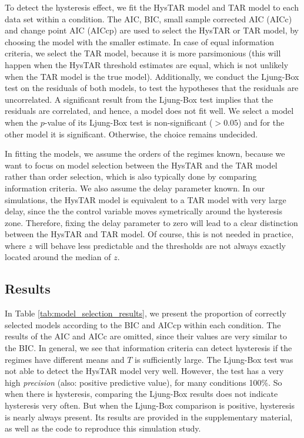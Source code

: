 \documentclass{article}
\begin{document}
To detect the hysteresis effect, we fit the HysTAR model and TAR model to each data set within a condition.
The AIC, BIC, small sample corrected AIC (AICc) and change point AIC (AICcp) are used to select the HysTAR or TAR model, by choosing the model with the smaller estimate.
In case of equal information criteria, we select the TAR model, because it is more parsimonious (this will happen when the HysTAR threshold estimates are equal, which is not unlikely when the TAR model is the true model). 
Additionally, we conduct the Ljung-Box test on the residuals of both models, to test the hypotheses that the residuals are uncorrelated.
A significant result from the Ljung-Box test implies that the residuals are correlated, and hence, a model does not fit well.
We select a model when the $p$-value of its Ljung-Box test is non-significant ($>0.05$) and for the other model it is significant. Otherwise, the choice remains undecided.

In fitting the models, we assume the orders of the regimes known, because we want to focus on model selection between the HysTAR and the TAR model rather than order selection, which is also typically done by comparing information criteria. 
We also assume the delay parameter known. 
In our simulations, the HysTAR model is equivalent to a TAR model with very large delay, since the the control variable moves symetrically around the hysteresis zone.
Therefore, fixing the delay parameter to zero will lead to a clear distinction between the HysTAR and TAR model.
Of course, this is not needed in practice, where $z$ will behave less predictable and the thresholds are not always exactly located around the median of $z$.

\subsection{Results}
\label{sec:model_selection_results}
In Table \ref{tab:model_selection_results}, we present the proportion of correctly selected models according to the BIC and AICcp within each condition. The results of the AIC and AICc are omitted, since their values are very similar to the BIC. In general, we see that information criteria can detect hysteresis if the regimes have different means and $T$ is sufficiently large. 
The Ljung-Box test was not able to detect the HysTAR model very well. However, the test has a very high \textit{precision} (also: positive predictive value), for many conditions 100\%. So when there is hysteresis, comparing the Ljung-Box results does not indicate hysteresis very often. But when the Ljung-Box comparison is positive, hysteresis is nearly always present.
Its results are provided in the supplementary material, as well as the code to reproduce this simulation study.
\end{document}
